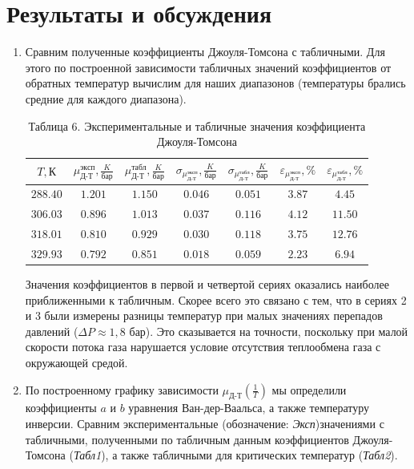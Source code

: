 \documentclass[a4paper]{article}
\begin{document}
\section{Результаты и обсуждения}
\begin{enumerate}
\item Сравним полученные коэффициенты Джоуля-Томсона с табличными. Для этого по построенной зависимости табличных значений коэффициентов от обратных температур вычислим для наших диапазонов (температуры брались средние для каждого диапазона).\\
\begin{table}[h!]
    \centering
    \begin{tabular}{|c|c|c|c|c|c|c|}
        \hline
        $T, \text{К}$ & $\mu_{\text{Д-Т}}^{\text{эксп}}, \frac{K}{\text{бар}}$ & $\mu_{\text{Д-Т}}^{\text{табл}}, \frac{K}{\text{бар}}$ & $\sigma_{\mu_{\text{Д-Т}}^{\text{эксп}}}, \frac{K}{\text{бар}}$ & $\sigma_{\mu_{\text{Д-Т}}^{\text{табл}}}, \frac{K}{\text{бар}}$ & $\varepsilon_{\mu_{\text{Д-Т}}^{\text{эксп}}}, \%$ & $\varepsilon_{\mu_{\text{Д-Т}}^{\text{табл}}}, \%$ \\ 
        \hline
        $288.40$ & $1.201$ & $1.150$ & $0.046$ & $0.051$ & $3.87$ & $4.45$ \\ \hline
        $306.03$ & $0.896$ & $1.013$ & $0.037$ & $0.116$ & $4.12$ & $11.50$ \\ \hline
        $318.01$ & $0.810$ & $0.929$ & $0.030$ & $0.118$ & $3.75$ & $12.76$ \\ \hline
        $329.93$ & $0.792$ & $0.851$ & $0.018$ & $0.059$ & $2.23$ & $6.94$ \\ 
        \hline
    \end{tabular}
    \caption{Таблица 6. Экспериментальные и табличные значения коэффициента Джоуля-Томсона}
\end{table}
Значения коэффициентов в первой и четвертой сериях оказались наиболее приближенными к табличным. Скорее всего это связано с тем, что в сериях 2 и 3 были измерены разницы температур при малых значениях перепадов давлений ($\Delta P \approx 1,8$ бар). Это сказывается на точности, поскольку при малой скорости потока газа нарушается условие отсутствия
теплообмена газа с окружающей средой.
\item По построенному графику зависимости $\mu_{\text{Д-Т}}(\frac{1}{T})$ мы определили коэффициенты $a$ и $b$ уравнения Ван-дер-Ваальса, а также температуру инверсии. Сравним экспериментальные (обозначение: \textit{Эксп})значениями с табличными, полученными по табличным данным коэффициентов Джоуля-Томсона (\textit{Табл1}), а также табличными для критических температур (\textit{Табл2}).

\end{enumerate}
\end{document}
